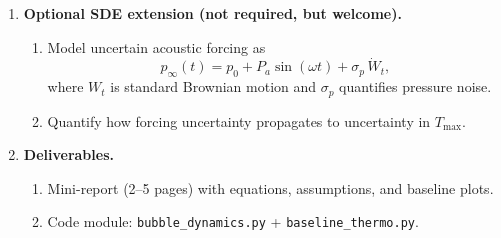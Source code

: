 \documentclass[11pt]{article}
\begin{document}
\begin{enumerate}
		\item \textbf{Optional SDE extension (not required, but welcome).}
		\begin{enumerate}
			\item Model uncertain acoustic forcing as
			\[
			p_{\infty}(t) = p_0 + P_a \sin(\omega t) + \sigma_p\,\dot W_t,
			\]
			where \(W_t\) is standard Brownian motion and \(\sigma_p\) quantifies pressure noise.
			\item Quantify how forcing uncertainty propagates to uncertainty in \(T_{\max}\).
		\end{enumerate}
		
		\item \textbf{Deliverables.}
		\begin{enumerate}
			\item Mini-report (2--5 pages) with equations, assumptions, and baseline plots.
			\item Code module: \texttt{bubble\_dynamics.py} + \texttt{baseline\_thermo.py}.
		\end{enumerate}
	\end{enumerate}
	
	\newpage
	
\end{document}
